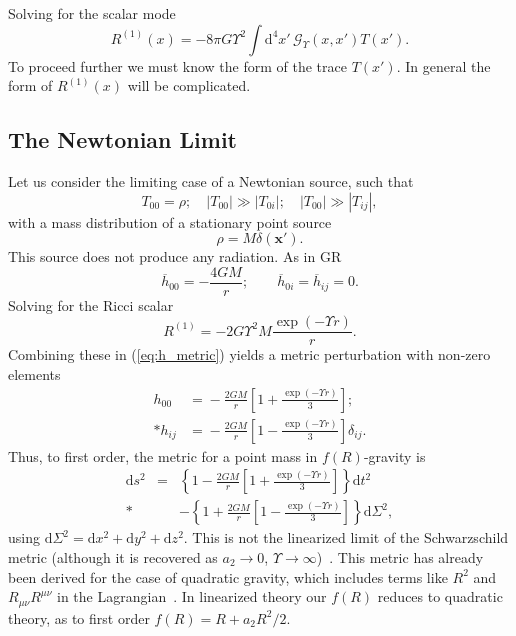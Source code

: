 \documentclass[aps,prd,amsfonts,amssymb,amsmath,nofootinbib,reprint,showpacs]{revtex4-1}
\newcommand{\eqnref}[1]{(\ref{eq:#1})}
\newcommand{\dd}{\ensuremath{\text{d}}}
\begin{document}
Solving for the scalar mode
\begin{equation}
R^{(1)}(x) = -8 \pi G \Upsilon^2 \int \dd^4 x'\, \mathscr{G}_\Upsilon(x, x') T(x').
\end{equation}
To proceed further we must know the form of the trace $T(x')$. In general the form of $R^{(1)}(x)$ will be complicated.

\subsection{The Newtonian Limit}

Let us consider the limiting case of a Newtonian source, such that
\begin{equation}
T_{00} = \rho; \quad |T_{00}| \gg |T_{0i}|; \quad |T_{00}| \gg |T_{ij}|,
\end{equation}
with a mass distribution of a stationary point source
\begin{equation}
\rho = M\delta(\boldsymbol{x'}).
\end{equation}
This source does not produce any radiation. As in GR
\begin{equation}
\overline{h}_{00} = -\frac{4GM}{r}; \qquad \overline{h}_{0i} = \overline{h}_{ij} = 0.
\end{equation}
Solving for the Ricci scalar
\begin{equation}
R^{(1)} = -2 G \Upsilon^2 M \frac{\exp(- \Upsilon r)}{r}.
\end{equation}
Combining these in \eqnref{h_metric} yields a metric perturbation with non-zero elements 
\begin{equation}
\begin{split}
h_{00} & = {} -\frac{2GM}{r}\left[1 + \frac{\exp(- \Upsilon r)}{3}\right]; \\*
h_{ij} & = {} -\frac{2GM}{r}\left[1 - \frac{\exp(- \Upsilon r)}{3}\right]\delta_{ij}.
\end{split}
\end{equation}
Thus, to first order, the metric for a point mass in $f(R)$-gravity is~\cite{Capozziello2007, Capozziello2009a, Naf2010}
\begin{eqnarray}
\dd s^2 & = & \left\{1-\frac{2GM}{r}\left[1 + \frac{\exp(- \Upsilon r)}{3}\right]\right\}\dd t^2 \nonumber \\*
 & & - \left\{1+\frac{2GM}{r}\left[1 - \frac{\exp(- \Upsilon r)}{3}\right]\right\}\dd \Sigma^2,
\label{eq:f(R)_Schw}
\end{eqnarray}
using $\dd \Sigma^2 = \dd x^2 + \dd y^2 + \dd z^2$. This is not the linearized limit of the Schwarzschild metric (although it is recovered as $a_2 \rightarrow 0$, $\Upsilon \rightarrow \infty$)~\cite{Chiba2007a}. This metric has already been derived for the case of quadratic gravity, which includes terms like $R^2$ and $R_{\mu\nu}R^{\mu\nu}$ in the Lagrangian~\cite{Pechlaner1966, Stelle1978, Schmidt1986, Teyssandier1990}. In linearized theory our $f(R)$ reduces to quadratic theory, as to first order $f(R) = R + a_2 R^2/2$.
\end{document}
